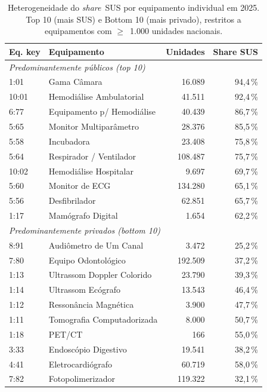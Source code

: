 \documentclass[12pt,a4paper,oneside]{article}
\begin{document}
\begin{table}[htbp]
\centering
\caption{Heterogeneidade do \textit{share}~SUS por equipamento
individual em 2025. Top 10 (mais SUS) e Bottom 10 (mais privado),
restritos a equipamentos com $\geq$~1{.}000 unidades nacionais.}
\label{tab:share-individual-extremos}
\small
\begin{tabular}{l l r r}
\toprule
\textbf{Eq. key} & \textbf{Equipamento} & \textbf{Unidades} &
\textbf{Share SUS} \\
\midrule
\multicolumn{4}{l}{\textit{Predominantemente públicos (top 10)}} \\
\midrule
1{:}01  & Gama Câmara                   &  16.089 & 94{,}4\,\% \\
10{:}01 & Hemodiálise Ambulatorial      &  41.511 & 92{,}4\,\% \\
6{:}77  & Equipamento p/ Hemodiálise    &  40.439 & 86{,}7\,\% \\
5{:}65  & Monitor Multiparâmetro        &  28.376 & 85{,}5\,\% \\
5{:}58  & Incubadora                    &  23.408 & 75{,}8\,\% \\
5{:}64  & Respirador / Ventilador       & 108.487 & 75{,}7\,\% \\
10{:}02 & Hemodiálise Hospitalar        &   9.697 & 69{,}7\,\% \\
5{:}60  & Monitor de ECG                & 134.280 & 65{,}1\,\% \\
5{:}56  & Desfibrilador                 &  62.851 & 65{,}7\,\% \\
1{:}17  & Mamógrafo Digital             &   1.654 & 62{,}2\,\% \\
\midrule
\multicolumn{4}{l}{\textit{Predominantemente privados (bottom 10)}} \\
\midrule
8{:}91  & Audiômetro de Um Canal        &   3.472 & 25{,}2\,\% \\
7{:}80  & Equipo Odontológico           & 192.509 & 37{,}2\,\% \\
1{:}13  & Ultrassom Doppler Colorido    &  23.790 & 39{,}3\,\% \\
1{:}14  & Ultrassom Ecógrafo            &  13.543 & 46{,}4\,\% \\
1{:}12  & Ressonância Magnética         &   3.900 & 47{,}7\,\% \\
1{:}11  & Tomografia Computadorizada    &   8.000 & 50{,}7\,\% \\
1{:}18  & PET/CT                        &     166 & 55{,}0\,\% \\
3{:}33  & Endoscópio Digestivo          &  19.541 & 38{,}2\,\% \\
4{:}41  & Eletrocardiógrafo             &  60.719 & 58{,}0\,\% \\
7{:}82  & Fotopolimerizador             & 119.322 & 32{,}1\,\% \\
\bottomrule
\end{tabular}
\end{table}
\end{document}
